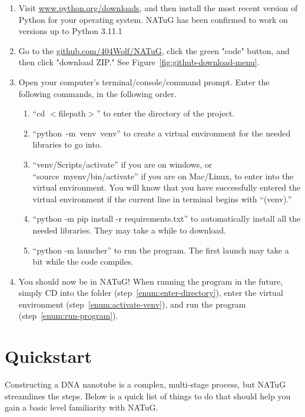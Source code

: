 \documentclass[titlepage]{article}
\begin{document}
	\begin{enumerate} \label{sect:getting-natug-running}
		\item Visit \href{Python's download page}{www.python.org/downloads}, and then install the most recent version of Python for your operating system. NATuG has been confirmed to work on versions up to Python 3.11.1
		\item Go to the \href{NATuG’s Github page}{github.com/404Wolf/NATuG}, click the green "code" button, and then click "download ZIP." See Figure~\ref{fig:github-download-menu}.
		\item Open your computer’s terminal/console/command prompt. Enter the following commands, in the following order. 
		
		\begin{enumerate}
			\item “cd $<$filepath$>$” to enter the directory of the project. \label{enum:enter-directory}
			\item “python~-m~venv~venv” to create a virtual environment for the needed libraries to go into.
			\item “venv/Scripts/activate” if you are on windows, or “source~myenv/bin/activate” if you are on Mac/Linux, to enter into the virtual environment. You will know that you have successfully entered the virtual environment if the current line in terminal begins with “(venv).” \label{enum:activate-venv}
			\item “python -m pip install -r requirements.txt” to automatically install all the needed libraries. They may take a while to download.
			\item “python -m launcher” to run the program. The first launch may take a bit while the code compiles. \label{enum:run-program}
		\end{enumerate}
	
		\item You should now be in NATuG! When running the program in the future, simply CD into the folder (step~\ref{enum:enter-directory}), enter the virtual environment (step~\ref{enum:activate-venv}), and run the program (step~\ref{enum:run-program}).
	\end{enumerate}

	\section{Quickstart}
	
	Constructing a DNA nanotube is a complex, multi-stage process, but NATuG streamlines the steps. Below is a quick list of things to do that should help you gain a basic level familiarity with NATuG. 
	
\end{document}
